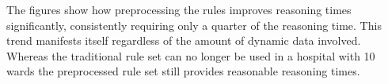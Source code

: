The figures show how preprocessing the rules improves reasoning times significantly,  consistently requiring only a quarter of the reasoning time.
This trend manifests itself regardless of the amount of dynamic data involved.
Whereas the traditional rule set can no longer be used in a hospital with 10 wards the 
preprocessed rule set still provides reasonable reasoning times. 
 
